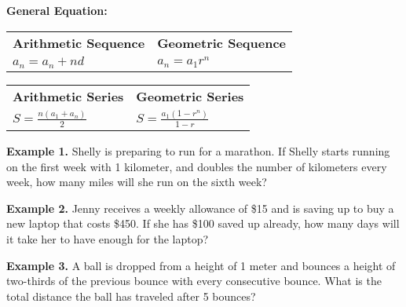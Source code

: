 \bigskip
\textbf{General Equation:}

\bigskip
\begin{tabularx}{\textwidth}{*2{@{}>{\centering\arraybackslash}X}}
\textbf{Arithmetic Sequence} & \textbf{Geometric Sequence}\\
$a_n=a_n+nd$ & $a_n=a_1r^n$
\end{tabularx}

\vfill
\begin{tabularx}{\textwidth}{*2{@{}>{\centering\arraybackslash}X}}
\textbf{Arithmetic Series} & \textbf{Geometric Series}\\
$S=\frac{n(a_1+a_n)}{2}$ & $S=\frac{a_1(1-r^n)}{1-r}$
\end{tabularx}

\vfill
\textbf{Example 1.} Shelly is preparing to run for a marathon. If Shelly starts running on the first week with 1 kilometer, and doubles the number of kilometers every week, how many miles will she run on the sixth week?

\vfill
\textbf{Example 2.} Jenny receives a weekly allowance of \$15 and is saving up to buy a new laptop that costs \$450. If she has \$100 saved up already, how many days will it take her to have enough for the laptop?

\vfill
\textbf{Example 3.} A ball is dropped from a height of 1 meter and bounces a height of two-thirds of the previous bounce with every consecutive bounce. What is the total distance the ball has traveled after 5 bounces?

